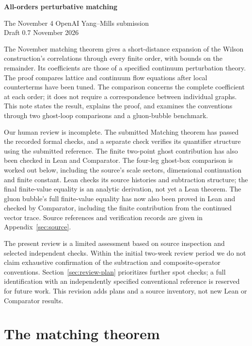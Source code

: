 \documentclass[11pt]{article}
\begin{document}
\begin{center}
{\LARGE\bfseries All-orders perturbative matching}\par
\vspace{4pt}
The November 4 OpenAI Yang--Mills submission\\
Draft 0.7 \quad\textbullet{} November 2026
\end{center}

The November matching theorem gives a short-distance expansion of the
Wilson construction's correlations through every finite order, with bounds
on the remainder. Its coefficients are those of a specified continuum
perturbation theory. The proof compares
lattice and continuum flow equations after local counterterms have been
tuned. The comparison concerns the complete coefficient at each order;
it does not require a correspondence between individual graphs. This note
states the result, explains the proof, and examines the conventions through
two ghost-loop comparisons and a gluon-bubble benchmark.

Our human review is incomplete. The submitted Matching theorem has passed
the recorded formal checks, and a separate check verifies its quantifier
structure using the submitted reference. The finite two-point ghost
contribution has also been checked in Lean and Comparator. The four-leg
ghost-box comparison is worked out below, including the source's scale
sectors, dimensional continuation and finite constant. Lean checks its
source histories and subtraction structure; the final finite-value equality
is an analytic derivation, not yet a Lean theorem. The gluon bubble's full finite-value equality has now also been proved in Lean and checked by Comparator, including the finite contribution from the continued vector trace. Source references
and verification records are given
in Appendix~\ref{sec:source}.

The present review is a limited assessment based on source inspection and
selected independent checks. Within the initial two-week review period we
do not claim exhaustive confirmation of the subtraction and composite-operator
conventions. Section~\ref{sec:review-plan} prioritizes further spot checks;
a full identification with an independently specified conventional reference
is reserved for future work. This revision adds plans and a source inventory,
not new Lean or Comparator results.

\section{The matching theorem}
\label{sec:result}
\end{document}
